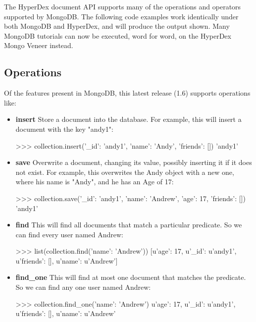 The HyperDex document API supports many of the operations and operators
supported by MongoDB.  The following code examples work identically under both
MongoDB and HyperDex, and will produce the output shown.  Many MongoDB tutorials
can now be executed, word for word, on the HyperDex Mongo Veneer instead.

\subsection{Operations}

Of the features present in MongoDB, this latest release (1.6) supports
operations like:

\begin{itemize}
    \item \textbf{insert} Store a document into the database.  For example, this
        will insert a document with the key "andy1":

\begin{pythoncode}
>>> collection.insert({'_id': 'andy1', 'name': 'Andy', 'friends': []})
'andy1'
\end{pythoncode}

    \item \textbf{save}  Overwrite a document, changing its value, possibly
        inserting it if it does not exist.  For example, this overwrites the
        Andy object with a new one, where his name is "Andy", and he has an Age
        of 17:

\begin{pythoncode}
>>> collection.save({'_id': 'andy1', 'name': 'Andrew', 'age': 17, 'friends': []})
'andy1'
\end{pythoncode}

    \item \textbf{find}  This will find all documents that match a particular
        predicate.  So we can find every user named Andrew:

\begin{pythoncode}
>>> list(collection.find({'name': 'Andrew'}))
[{u'age': 17, u'_id': u'andy1', u'friends': [], u'name': u'Andrew'}]
\end{pythoncode}

    \item \textbf{find\_one}  This will find at most one document that matches the
        predicate.  So we can find any one user named Andrew:

\begin{pythoncode}
>>> collection.find_one({'name': 'Andrew'})
{u'age': 17, u'_id': u'andy1', u'friends': [], u'name': u'Andrew'}
\end{pythoncode}


\end{itemize}
